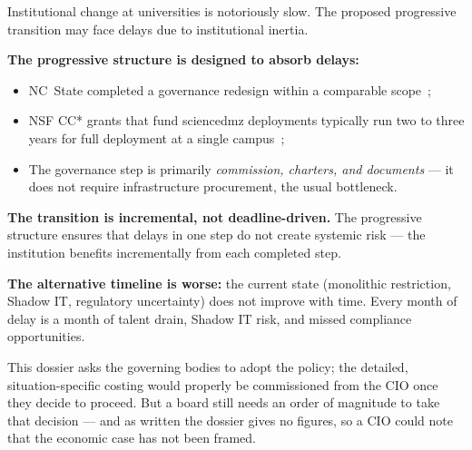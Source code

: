 \bigskip

\begin{questionbox}
Institutional change at universities is notoriously slow. The proposed progressive transition may face delays due to institutional inertia.
\end{questionbox}

\begin{answerbox}[Answer to Q9.2]
\textbf{The progressive structure is designed to absorb delays:}
\begin{itemize}[nosep]
    \item NC~State completed a governance redesign within a comparable scope~\cite{ncsu-governance};
    \item NSF CC* grants that fund \gls{sciencedmz} deployments typically run two to three years for full deployment at a single campus~\cite{nsf-cc};
    \item The governance step is primarily \emph{commission, charters, and documents} --- it does not require infrastructure procurement, the usual bottleneck.
\end{itemize}

\noindent\textbf{The transition is incremental, not deadline-driven.} The progressive structure ensures that delays in one step do not create systemic risk --- the institution benefits incrementally from each completed step.

\medskip\noindent\textbf{The alternative timeline is worse:} the current state (monolithic restriction, Shadow IT, regulatory uncertainty) does not improve with time. Every month of delay is a month of talent drain, Shadow IT risk, and missed compliance opportunities.
\end{answerbox}

\bigskip

\begin{questionbox}
This dossier asks the governing bodies to adopt the policy; the detailed, situation-specific costing would properly be commissioned from the CIO once they decide to proceed. But a board still needs an order of magnitude to take that decision --- and as written the dossier gives no figures, so a CIO could note that the economic case has not been framed.
\end{questionbox}

